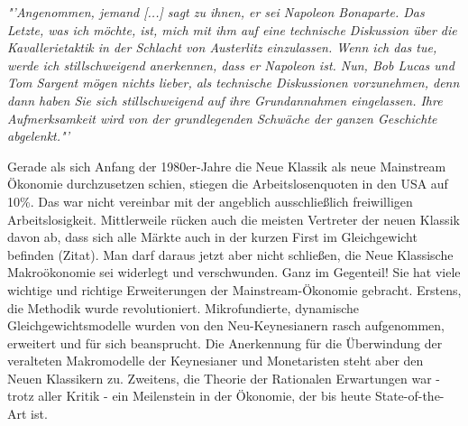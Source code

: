 \textit{"'Angenommen, jemand [...] sagt zu ihnen, er sei Napoleon Bonaparte. Das Letzte, was ich möchte, ist, mich mit ihm auf eine technische Diskussion über die Kavallerietaktik in der Schlacht von Austerlitz einzulassen. Wenn ich das tue, werde ich stillschweigend anerkennen, dass er Napoleon ist. Nun, Bob Lucas und Tom Sargent mögen nichts lieber, als technische Diskussionen vorzunehmen, denn dann haben Sie sich stillschweigend auf ihre Grundannahmen eingelassen. Ihre Aufmerksamkeit wird von der grundlegenden Schwäche der ganzen Geschichte abgelenkt."'}

Gerade als sich Anfang der 1980er-Jahre die Neue Klassik als neue Mainstream Ökonomie durchzusetzen schien, stiegen die Arbeitslosenquoten in den USA auf 10\%. Das war nicht vereinbar mit der angeblich ausschließlich freiwilligen Arbeitslosigkeit. Mittlerweile rücken auch die meisten Vertreter der neuen Klassik davon ab, dass sich alle Märkte auch in der kurzen First im Gleichgewicht befinden (Zitat).
Man darf daraus jetzt aber nicht schließen, die Neue Klassische Makroökonomie sei widerlegt und verschwunden. Ganz im Gegenteil! Sie hat viele wichtige und richtige Erweiterungen der Mainstream-Ökonomie gebracht. Erstens, die Methodik wurde revolutioniert. Mikrofundierte, dynamische Gleichgewichtsmodelle wurden von den Neu-Keynesianern rasch aufgenommen, erweitert und für sich beansprucht. Die Anerkennung für die Überwindung der veralteten Makromodelle der Keynesianer und Monetaristen steht aber den Neuen Klassikern zu. Zweitens, die Theorie der Rationalen Erwartungen war - trotz aller Kritik - ein Meilenstein in der Ökonomie, der bis heute State-of-the-Art ist.

